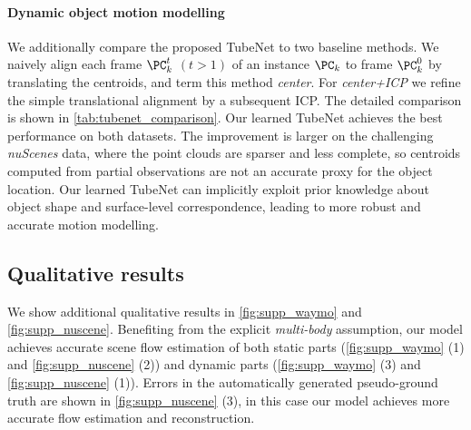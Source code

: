 \paragraph{Dynamic object motion modelling}
We additionally compare the proposed TubeNet to two baseline methods. We naively align each frame $\PC_k^t$ $(t>1)$ of an instance $\PC_k$ to frame $\PC_k^0$ by %
translating the centroids, and term this method \textit{center}. For \textit{center+ICP} we refine the simple translational alignment by a subsequent ICP. The detailed comparison is shown in \cref{tab:tubenet_comparison}. Our learned TubeNet achieves the best performance on both datasets. The improvement is larger on the challenging \emph{nuScenes} data, where the point clouds are sparser and less complete, so centroids computed from partial observations are not an accurate proxy for the object location. Our learned TubeNet can implicitly exploit prior knowledge about object shape and surface-level correspondence, leading to more robust and accurate motion modelling. 

\subsection{Qualitative results}
\label{sec:supp_qual}
We show additional qualitative results in \cref{fig:supp_waymo} and \cref{fig:supp_nuscene}. Benefiting from the explicit \textit{multi-body} assumption, our model achieves accurate scene flow estimation of both static parts (\cref{fig:supp_waymo} (1) and \cref{fig:supp_nuscene} (2)) and dynamic parts (\cref{fig:supp_waymo} (3) and \cref{fig:supp_nuscene} (1)). Errors in the automatically generated pseudo-ground truth are shown in \cref{fig:supp_nuscene} (3), in this case our model achieves more accurate flow estimation and reconstruction.  




